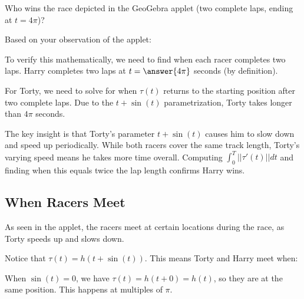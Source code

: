 \documentclass{ximera}
\begin{document}
\begin{problem}
    Who wins the race depicted in the GeoGebra applet (two complete laps, ending at $t=4\pi$)?
    
    Based on your observation of the applet:
    \begin{multipleChoice}
    \end{multipleChoice}
    
    To verify this mathematically, we need to find when each racer completes two laps. Harry completes two laps at $t=\answer{4\pi}$ seconds (by definition).
    
    For Torty, we need to solve for when $\tau(t)$ returns to the starting position after two complete laps. Due to the $t+\sin(t)$ parametrization, Torty takes longer than $4\pi$ seconds.
    
    \begin{feedback}
        The key insight is that Torty's parameter $t+\sin(t)$ causes him to slow down and speed up periodically. While both racers cover the same track length, Torty's varying speed means he takes more time overall. Computing $\int_0^T ||\tau'(t)||dt$ and finding when this equals twice the lap length confirms Harry wins.
    \end{feedback}
\end{problem}

\subsection*{When Racers Meet}

\begin{problem}
    As seen in the applet, the racers meet at certain locations during the race, as Torty speeds up and slows down.
    
    Notice that $\tau(t)=h(t+\sin(t))$. This means Torty and Harry meet when:
    \begin{multipleChoice}
    \end{multipleChoice}
    
    \begin{feedback}
        When $\sin(t)=0$, we have $\tau(t)=h(t+0)=h(t)$, so they are at the same position. This happens at multiples of $\pi$.
    \end{feedback}
\end{problem}
\end{document}

